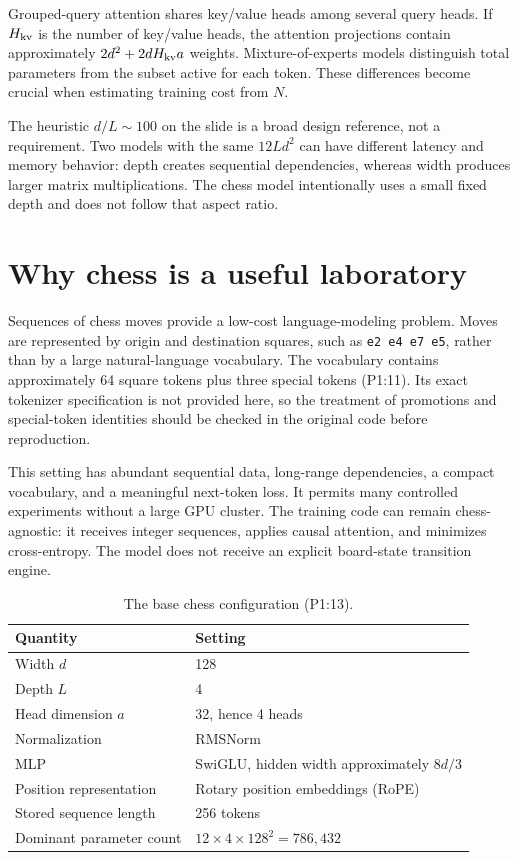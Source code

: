 Grouped-query attention shares key/value heads among several query heads. If $H_{\rm kv}$ is the number of key/value heads, the attention projections contain approximately $2d^2+2dH_{\rm kv}a$ weights. Mixture-of-experts models distinguish total parameters from the subset active for each token. These differences become crucial when estimating training cost from $N$.

The heuristic $d/L\sim100$ on the slide is a broad design reference, not a requirement. Two models with the same $12Ld^2$ can have different latency and memory behavior: depth creates sequential dependencies, whereas width produces larger matrix multiplications. The chess model intentionally uses a small fixed depth and does not follow that aspect ratio.

\section{Why chess is a useful laboratory}
Sequences of chess moves provide a low-cost language-modeling problem. Moves are represented by origin and destination squares, such as \texttt{e2 e4 e7 e5}, rather than by a large natural-language vocabulary. The vocabulary contains approximately 64 square tokens plus three special tokens (P1:11). Its exact tokenizer specification is not provided here, so the treatment of promotions and special-token identities should be checked in the original code before reproduction.

This setting has abundant sequential data, long-range dependencies, a compact vocabulary, and a meaningful next-token loss. It permits many controlled experiments without a large GPU cluster. The training code can remain chess-agnostic: it receives integer sequences, applies causal attention, and minimizes cross-entropy. The model does not receive an explicit board-state transition engine.


\begin{table}[htbp]\centering
\caption{The base chess configuration (P1:13).}
\begin{tabular}{ll}\toprule
Quantity & Setting\\\midrule
Width $d$ & 128\\
Depth $L$ & 4\\
Head dimension $a$ & 32, hence 4 heads\\
Normalization & RMSNorm\\
MLP & SwiGLU, hidden width approximately $8d/3$\\
Position representation & Rotary position embeddings (RoPE)\\
Stored sequence length & 256 tokens\\
Dominant parameter count & $12\times4\times128^2=786{,}432$\\\bottomrule
\end{tabular}
\end{table}

